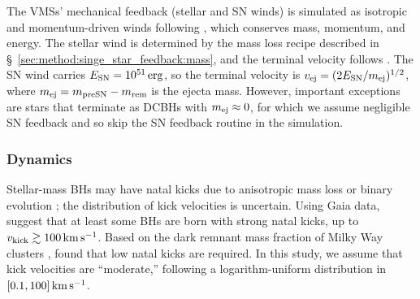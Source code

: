 \documentclass[twocolumn]{aastex631}
\begin{document}
The VMSs' mechanical feedback (stellar and SN winds) is simulated as isotropic and momentum-driven winds following \citet{HopkinsWetzelKeres_2018MNRAS.477.1578H}, which conserves mass, momentum, and energy. The stellar wind is determined by the mass loss recipe described in \S~\ref{sec:method:singe_star_feedback:mass}, and the terminal velocity follows \citet{Vink_2018A&A...615A.119V}.
The SN wind carries $E_{\rm SN} = 10^{51}\,\rm erg$, so the terminal velocity is $ v_{\rm ej} = (2E_{\rm SN}/m_{\rm ej})^{1/2}$, where $m_{\rm ej} = m_{\rm preSN} - m_{\rm rem}$ is the ejecta mass. However, important exceptions are stars that terminate as DCBHs with $m_{\rm ej}\approx 0$,  for which we assume negligible SN feedback and so skip the SN feedback routine in the simulation.

\subsubsection{Dynamics}

Stellar-mass BHs may have natal kicks due to anisotropic mass loss or binary evolution \citep{ArcaSeddaMapelliBenacquista_2023MNRAS.520.5259A}; the distribution of kick velocities is uncertain. Using Gaia data, \citet{NagarajanEl-Badry_2025PASP..137c4203N} suggest that at least some BHs are born with strong natal kicks, up to $v_{\rm kick}\gtrsim 100\,\rm km\,{s}^{-1}$. Based on the dark remnant mass fraction of Milky Way clusters \citep{DicksonSmithHenault-Brunet_2024MNRAS.529..331D}, \citet{Rostami-ShiraziBaumgardtZonoozi_2025MNRAS.536.1332R} found that low natal kicks \citep[compared to $\sigma_{v} = 190\,\rm km\,{s}^{-1}$ for pulsars;][]{HansenPhinney_1997MNRAS.291..569H} are required. In this study, we assume that kick velocities are ``moderate,'' following a logarithm-uniform distribution in $[0.1,100]\,\rm km\,{s}^{-1}$.
\end{document}
